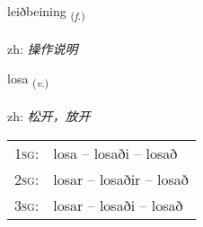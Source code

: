 \documentclass[frontgrid, backgrid]{flacards}\usepackage[]{graphicx}\usepackage[]{color}
\begin{document}
\renewcommand{\flhead}{\vskip5pt \fboxsep=0pt {\small\bfseries\footnotesize Nafnorð | 名词}}
\renewcommand{\fcfoot}{\vskip5pt \fboxsep=0pt \hspace{2pt}{\small\bfseries\footnotesize 2K}}

\renewcommand{\blhead}{\vskip5pt {\small\bfseries\footnotesize Nafnorð | 名词 }}
\renewcommand{\bcfoot}{\vskip5pt \hspace{2pt}{\small\bfseries\footnotesize 2K}}


{leiðbeining \small{\textsubscript{(\textit{f.})}} \\[1ex] %
\textphonetic{[leiðpeiniŋk]} \\
zh: \emph{操作说明} \\  [2ex]
\renewcommand*{\arraystretch}{0.8}
}

\renewcommand{\flhead}{\vskip5pt \fboxsep=0pt {\small\bfseries\footnotesize Sagnorð | 动词}}
\renewcommand{\fcfoot}{\vskip5pt \fboxsep=0pt \hspace{2pt}{\small\bfseries\footnotesize 2K}}

\renewcommand{\blhead}{\vskip5pt {\small\bfseries\footnotesize Sagnorð | 动词 }}
\renewcommand{\bcfoot}{\vskip5pt \hspace{2pt}{\small\bfseries\footnotesize 2K}}


{losa \small{\textsubscript{(\textit{v.})}} \\[1ex] %
\textphonetic{[lɔːsa]} \\
zh: \emph{松开，放开} \\  [2ex]
\renewcommand*{\arraystretch}{0.8}
\begin{tabular}{p{1cm}l}
\textsc{1sg}: & losa -- losaði -- losað \\ 
\textsc{2sg}: & losar -- losaðir -- losað \\ 
\textsc{3sg}: & losar -- losaði -- losað \\ 
\end{tabular}
}
\end{document}

